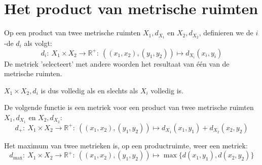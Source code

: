 \documentclass[main.tex]{subfiles}
\begin{document}
\section{Het product van metrische ruimten}
\label{sec:het-product-van}

\begin{de}
  Op een product van twee metrische ruimten $X_{1},d_{X_{1}}$ en $X_{2},d_{X_{2}}$, definieren we de $i$-de  $d_{i}$ als volgt:
  \[ d_{i}:\ X_{1}\times X_{2} \rightarrow \mathbb{R}^{+}:\ ((x_{1},x_{2}),(y_{1},y_{2})) \mapsto d_{X_{i}}(x_{i},y_{i}) \]
  De metriek 'selecteert' met andere woorden het resultaat van \'e\'en van de metrische ruimten.
\end{de}

\begin{opm}
  $X_{1}\times X_{2},d_{i}$ is dus volledig als en slechts als $X_{i}$ volledig is.
\end{opm}

\begin{vb}
  De volgende functie is een metriek voor een product van twee metrische ruimten $X_{1},d_{X_{1}}$ en $X_{2},d_{X_{2}}$:
  \[ d_{+}:\ X_{1}\times X_{2} \rightarrow \mathbb{R}^{+}:\ ((x_{1},x_{2}),(y_{1},y_{2})) \mapsto d_{X_{1}}(x_{1},y_{1}) + d_{X_{2}}(x_{2},y_{2}) \]
\end{vb}

\begin{vb}
  Het maximum van twee metrieken is, op een productruimte, weer een metriek:
  \[ d_{\max}:\ X_{1}\times X_{2} \rightarrow \mathbb{R}^{+}:\ ((x_{1},x_{2}),(y_{1},y_{2})) \mapsto \max\{ d(x_{1},y_{1}), d(x_{2},y_{2})\} \]
\end{vb}

\end{document}
